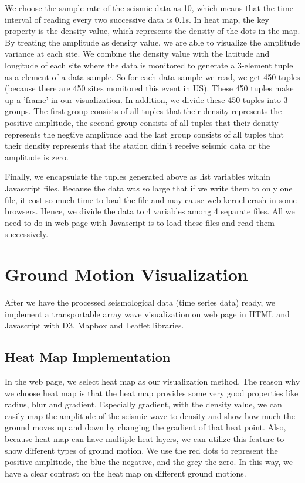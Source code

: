 \documentclass[9pt,twocolumn,twoside]{../../styles/osajnl}
\begin{document}
We choose the sample rate of the seismic data as 10, which means that the time interval of reading every two successive data is 0.1s. In heat map, the key property is the density value, which represents the density of the dots in the map. By treating the amplitude as density value, we are able to visualize the amplitude variance at each site. We combine the density value with the latitude and longitude of each site where the data is monitored to generate a 3-element tuple as a element of a data sample. So for each data sample we read, we get 450 tuples (because there are 450 sites monitored this event in US). These 450 tuples make up a 'frame' in our visualization. In addition, we divide these 450 tuples into 3 groups. The first group consists of all tuples that their density represents the positive amplitude, the second group consists of all tuples that their density represents the negtive amplitude and the last group consists of all tuples that their density represents that the station didn't receive seismic data or the amplitude is zero.

Finally, we encapsulate the tuples generated above as list variables within Javascript files. Because the data was so large that if we write them to only one file, it cost so much time to load the file and may cause web kernel crash in some browsers. Hence, we divide the data to 4 variables among 4 separate files. All we need to do in web page with Javascript is to load these files and read them successively.

\section{Ground Motion Visualization}

After we have the processed seismological data (time series data) ready, we implement a transportable array wave visualization on web page in HTML and Javascript with D3, Mapbox and Leaflet libraries.

\subsection{Heat Map Implementation}

In the web page, we select heat map as our visualization method. The reason why we choose heat map is that the heat map provides some very good properties like radius, blur and gradient. Especially gradient, with the density value, we can easily map the amplitude of the seismic wave to density and show how much the ground moves up and down by changing the gradient of that heat point. Also, because heat map can have multiple heat layers, we can utilize this feature to show different types of ground motion. We use the red dots to represent the positive amplitude, the blue the negative, and the grey the zero. In this way, we have a clear contrast on the heat map on different ground motions.
\end{document}
